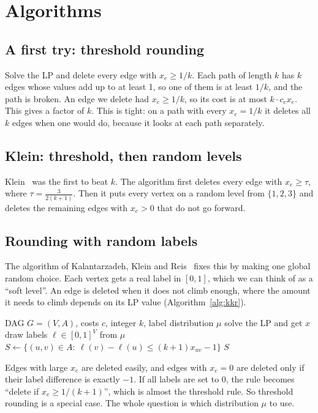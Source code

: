 \documentclass[sigconf,nonacm]{acmart}
\newcommand{\DED}{\textsc{DED}}
\begin{document}
\section{Algorithms}

\subsection{A first try: threshold rounding}
Solve the LP and delete every edge with $x_e\ge1/k$. Each path of length $k$ has $k$ edges whose values add up to at least 1, so one of them is at least $1/k$, and the path is broken. An edge we delete had $x_e\ge 1/k$, so its cost is at most $k\cdot c_ex_e$. This gives a factor of $k$. This is tight: on a path with every $x_e=1/k$ it deletes all $k$ edges when one would do, because it looks at each path separately.

\subsection{Klein: threshold, then random levels}
Klein~\cite{kw} was the first to beat $k$. The algorithm first deletes every edge with $x_e\ge\tau$, where $\tau=\frac{3}{2(k+1)}$. Then it puts every vertex on a random level from $\{1,2,3\}$ and deletes the remaining edges with $x_e>0$ that do not go forward.

\subsection{Rounding with random labels}\label{sec:labels}
The algorithm of Kalantarzadeh, Klein and Reis~\cite{kkr} fixes this by making one global random choice. Each vertex gets a real label in $[0,1]$, which we can think of as a ``soft level''. An edge is deleted when it does not climb enough, where the amount it needs to climb depends on its LP value (Algorithm~\ref{alg:kkr}).

\begin{algorithm}[t]
\caption{Label rounding for \DED$(k)$}\label{alg:kkr}
\begin{algorithmic}[1]
\Require DAG $G=(V,A)$, costs $c$, integer $k$, label distribution $\mu$
\State solve the LP and get $x$
\State draw labels $\ell\in[0,1]^V$ from $\mu$
\State $S\gets\{(u,v)\in A:\ \ell(v)-\ell(u)\le(k+1)x_{uv}-1\}$
\State \Return $S$
\end{algorithmic}
\end{algorithm}

 Edges with large $x_e$ are deleted easily, and edges with $x_e=0$ are deleted only if their label difference is exactly $-1$. If all labels are set to $0$, the rule becomes ``delete if $x_e\ge1/(k+1)$'', which is almost the threshold rule. So threshold rounding is a special case. The whole question is which distribution $\mu$ to use.
\end{document}
